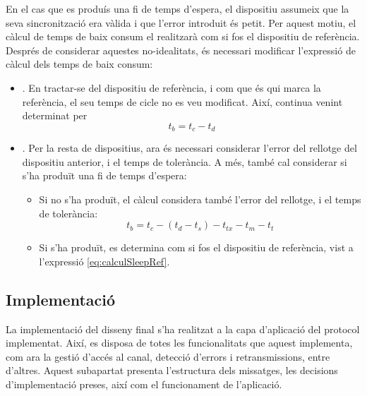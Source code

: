 \documentclass{tfgitic}[2024/07/01]
\begin{document}
{En el cas que es produís una fi de temps d'espera, el dispositiu assumeix que la seva sincronització era vàlida i que l'error introduit és petit. Per aquest motiu, el càlcul de temps de baix consum el realitzarà com si fos el dispositiu de referència. 
\newline
\newline
Després de considerar aquestes no-idealitats, és necessari modificar l'expressió de càlcul dels temps de baix consum:
\begin{itemize}
    \item {}. En tractar-se del dispositiu de referència, i com que és qui marca la referència, el seu temps de cicle no es veu modificat. Així, continua venint determinat per
    \begin{equation}
        t_b = t_c - t_d
        \label{eq:calculSleepRef}
    \end{equation}
    
    \item {}. Per la resta de dispositius, ara és necessari considerar l'error del rellotge del dispositiu anterior, i el temps de tolerància. A més, també cal considerar si s'ha produït una fi de temps d'espera:
    \begin{itemize}
        \item Si no s'ha produït, el càlcul considera també l'error del rellotge, i el temps de tolerància: 
        \begin{equation}
            t_b = t_c - (t_d - t_s) - t_{tx} - t_m - t_t
            \label{eq:calculSleepList}
        \end{equation}
        \item Si s'ha produït, es determina com si fos el dispositiu de referència, vist a l'expressió \ref{eq:calculSleepRef}.
    \end{itemize}
\end{itemize}

\subsection{Implementació}
La implementació del disseny final s'ha realitzat a la capa d'aplicació del protocol implementat. Així, es disposa de totes les funcionalitats que aquest implementa, com ara la gestió d'accés al canal, detecció d'errors i retransmissions, entre d'altres. Aquest subapartat presenta l'estructura dels missatges, les decisions d'implementació preses, així com el funcionament de l'aplicació.

}
\end{document}
